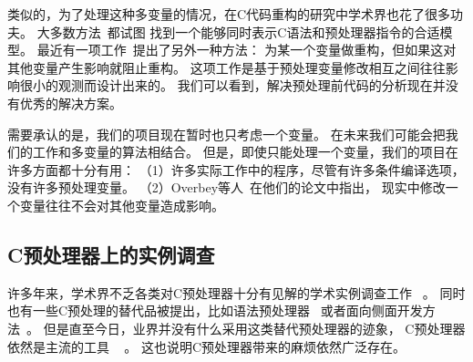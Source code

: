 类似的，为了处理这种多变量的情况，在C代码重构的研究中学术界也花了很多功夫。
大多数方法~\parencite{Garrido2002,Vittek2003,Spinellis2003,Garrido2013}都试图
找到一个能够同时表示C语法和预处理器指令的合适模型。
最近有一项工作~\parencite{Overbey2014}提出了另外一种方法：
为某一个变量做重构，但如果这对其他变量产生影响就阻止重构。
这项工作是基于预处理变量修改相互之间往往影响很小的观测而设计出来的。
我们可以看到，解决预处理前代码的分析现在并没有优秀的解决方案。

需要承认的是，我们的项目现在暂时也只考虑一个变量。
在未来我们可能会把我们的工作和多变量的算法相结合。
但是，即使只能处理一个变量，我们的项目在许多方面都十分有用：
（1）许多实际工作中的程序，尽管有许多条件编译选项，没有许多预处理变量。
（2）Overbey等人~\parencite{Overbey2014}在他们的论文中指出，
现实中修改一个变量往往不会对其他变量造成影响。




%
%

\subsection{C预处理器上的实例调查}
许多年来，学术界不乏各类对C预处理器十分有见解的学术实例调查工作
~\parencite{Spencer92,ernst2002empirical,Liebig2011}。
同时也有一些C预处理的替代品被提出，比如语法预处理器~\parencite{Weise1993,McCloskey:2005}
或者面向侧面开发方法~\parencite{Lohmann2006,Adams2009,Boucher2010}。
但是直至今日，业界并没有什么采用这类替代预处理器的迹象，
C预处理器依然是主流的工具 ~\parencite{Medeiros2015} 。
这也说明C预处理器带来的麻烦依然广泛存在。



